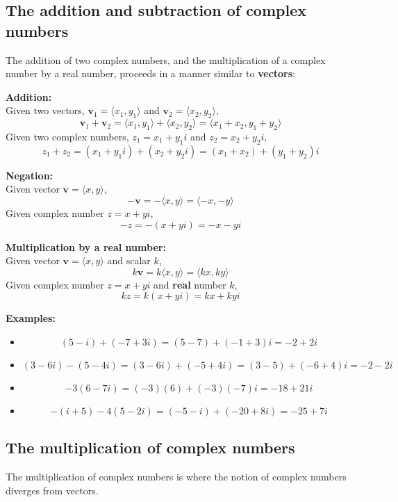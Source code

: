 \documentclass{article}
\begin{document}
\subsection*{The addition and subtraction of complex numbers}

The addition of two complex numbers, and the multiplication of a complex number by a real number, proceeds in a manner similar to {\bf vectors}:

\textbf{Addition:} \\
Given two vectors, \(\mathbf{v}_1 = \langle x_1, y_1 \rangle\) and \(\mathbf{v}_2 = \langle x_2, y_2 \rangle\), 
\[\mathbf{v}_1 + \mathbf{v}_2 = \langle x_1, y_1 \rangle + \langle x_2, y_2 \rangle = \langle x_1 + x_2, y_1 + y_2 \rangle\]
Given two complex numbers, \(z_1 = x_1 + y_1 i\) and \(z_2 = x_2 + y_2 i\), 
\[z_1 + z_2 = (x_1 + y_1 i) + (x_2 + y_2 i) = (x_1 + x_2) + (y_1 + y_2) i\]

\textbf{Negation:} \\
Given vector \(\mathbf{v} = \langle x, y \rangle\), 
\[-\mathbf{v} = -\langle x, y \rangle = \langle -x, -y \rangle\]
Given complex number \(z = x + y i\),
\[-z = -(x + y i) = -x - y i\]

\textbf{Multiplication by a real number:} \\
Given vector \(\mathbf{v} = \langle x, y \rangle\) and scalar \(k\),
\[k\mathbf{v} = k\langle x, y \rangle = \langle kx, ky \rangle\]
Given complex number \(z = x + y i\) and {\bf real} number \(k\),
\[kz = k(x + y i) = kx + ky i\]

\textbf{Examples:}
\begin{itemize}
\item 
\[(5 - i) + (-7 + 3i) = (5 - 7) + (-1 + 3)i = -2 + 2i\]
\item 
\[(3 - 6i) - (5 - 4i) = (3 - 6i) + (-5 + 4i) = (3 - 5) + (-6 + 4)i = -2 - 2i\]
\item 
\[-3(6 - 7i) = (-3)(6) + (-3)(-7)i = -18 + 21i\]
\item 
\[-(i + 5) - 4(5 - 2i) = (-5 - i) + (-20 + 8i) = -25 + 7i\]
\end{itemize}



\subsection*{The multiplication of complex numbers}

The multiplication of complex numbers is where the notion of complex numbers diverges from vectors.
\end{document}

